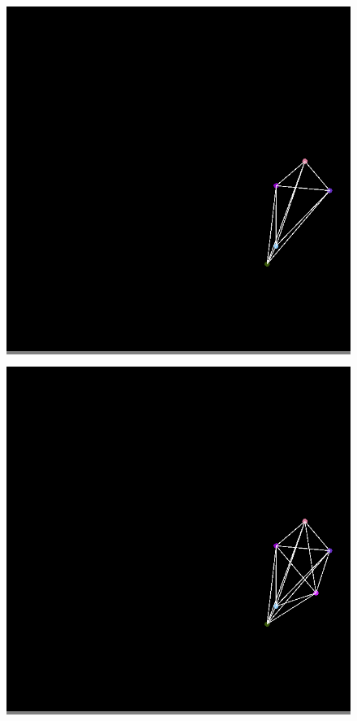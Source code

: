 \documentclass{article}
\begin{document}
\begin{figure}
\begin{minipage}{0.2\textwidth}
            \end{minipage}
            \vskip 0.1in
            \begin{minipage}{0.2\textwidth}
            \colorbox{gray}{\includegraphics[width=\linewidth]{./images/color-5.png}}
            \end{minipage}
            \hspace{\fill}
            \begin{minipage}{0.2\textwidth}
            \colorbox{gray}{\includegraphics[width=\linewidth]{./images/color-6.png}}

\end{minipage}
\end{figure}
\end{document}
